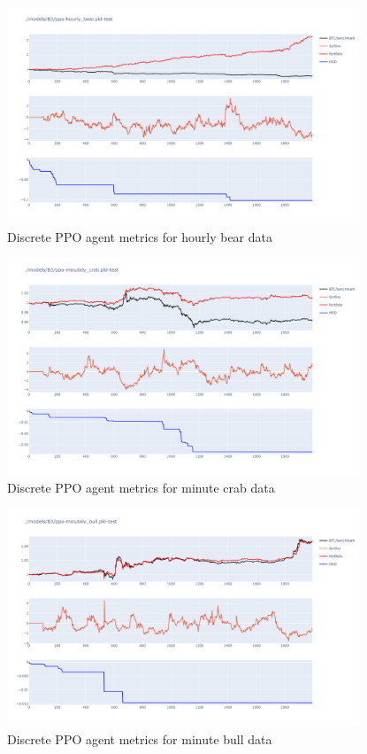 \begin{figure}[H]
    \centering
    \includegraphics[width=0.94\textwidth]{graphics/testphoto/ppo-disc-hbr.png}
    \caption{Discrete PPO agent metrics for hourly bear data}
    \label{f-ppo-disc-hbr}
\end{figure}

\begin{figure}[H]
    \centering
    \includegraphics[width=0.94\textwidth]{graphics/testphoto/ppo-disc-mcr.png}
    \caption{Discrete PPO agent metrics for minute crab data}
    \label{f-ppo-disc-mcr}
\end{figure}

\begin{figure}[H]
    \centering
    \includegraphics[width=0.94\textwidth]{graphics/testphoto/ppo-disc-mbu.png}
    \caption{Discrete PPO agent metrics for minute bull data}
    \label{f-ppo-disc-mbu}
\end{figure}

